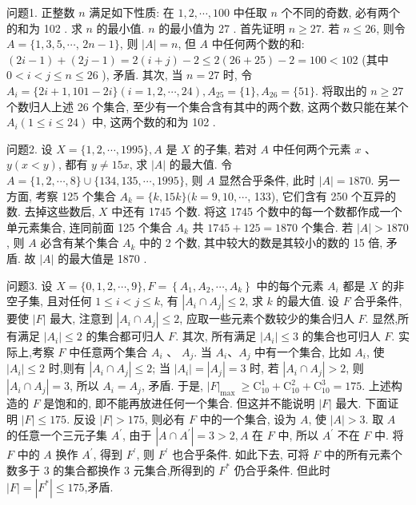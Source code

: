 
问题1. 正整数 $n$ 满足如下性质: 在 $1,2, \cdots, 100$ 中任取 $n$ 个不同的奇数, 必有两个的和为 102 . 求 $n$ 的最小值.
$n$ 的最小值为 27 . 首先证明 $n \geqslant 27$. 若 $n \leqslant 26$, 则令 $A=\{1,3,5, \cdots$, $2 n-1\}$, 则 $|A|=n$, 但 $A$ 中任何两个数的和: $(2 i-1)+(2 j-1)=2(i+j)- 2 \leqslant 2(26+25)-2=100<102$ (其中 $0<i<j \leqslant n \leqslant 26$ ), 矛盾.
其次, 当 $n=27$ 时, 令 $A_i=\{2 i+1,101-2 i\}(i=1,2, \cdots, 24), A_{25}=\{1\}, A_{26}= \{51\}$. 将取出的 $n \geqslant 27$ 个数归人上述 26 个集合, 至少有一个集合含有其中的两个数, 这两个数只能在某个 $A_i(1 \leqslant i \leqslant 24)$ 中, 这两个数的和为 102 .



问题2. 设 $X=\{1,2, \cdots, 1995\}, A$ 是 $X$ 的子集, 若对 $A$ 中任何两个元素 $x$ 、 $y(x<y)$, 都有 $y \neq 15 x$, 求 $|A|$ 的最大值.
令 $A=\{1,2, \cdots, 8\} \cup\{134,135, \cdots, 1995\}$, 则 $A$ 显然合乎条件, 此时 $|A|=1870$. 另一方面, 考察 125 个集合 $A_k=\{k, 15 k\}(k=9,10, \cdots$, 133), 它们含有 250 个互异的数.
去掉这些数后, $X$ 中还有 1745 个数.
将这 1745 个数中的每一个数都作成一个单元素集合, 连同前面 125 个集合 $A_k$ 共 $1745+125=1870$ 个集合.
若 $|A|>1870$, 则 $A$ 必含有某个集合 $A_k$ 中的 2 个数, 其中较大的数是其较小的数的 15 倍, 矛盾.
故 $|A|$ 的最大值是 1870 .



问题3. 设 $X=\{0,1,2, \cdots, 9\}, F=\left\{A_1, A_2, \cdots, A_k\right\}$ 中的每个元素 $A_i$ 都是 $X$ 的非空子集, 且对任何 $1 \leqslant i<j \leqslant k$, 有 $\left|A_i \cap A_j\right| \leqslant 2$, 求 $k$ 的最大值.
设 $F$ 合乎条件, 要使 $|F|$ 最大, 注意到 $\left|A_i \cap A_j\right| \leqslant 2$, 应取一些元素个数较少的集合归人 $F$. 显然,所有满足 $\left|A_i\right| \leqslant 2$ 的集合都可归人 $F$. 其次, 所有满足 $\left|A_i\right| \leqslant 3$ 的集合也可归人 $F$. 实际上,考察 $F$ 中任意两个集合 $A_i$ 、 $A_j$. 当 $A_i 、 A_j$ 中有一个集合, 比如 $A_i$, 使 $\left|A_i\right| \leqslant 2$ 时,则有 $\left|A_i \cap A_j\right| \leqslant 2$; 当 $\left|A_i\right|=\left|A_j\right|=3$ 时, 若 $\left|A_i \cap A_j\right|>2$, 则 $\left|A_i \cap A_j\right|=3$, 所以 $A_i=A_j$, 矛盾.
于是, $|F|_{\text {max }} \geqslant \mathrm{C}_{10}^1+\mathrm{C}_{10}^2+\mathrm{C}_{10}^3=175$. 上述构造的 $F$ 是饱和的, 即不能再放进任何一个集合.
但这并不能说明 $|F|$ 最大.
下面证明 $|F| \leqslant 175$. 反设 $|F|>175$, 则必有 $F$ 中的一个集合, 设为 $A$, 使 $|A|>3$. 取 $A$ 的任意一个三元子集 $A^{\prime}$, 由于 $\left|A \cap A^{\prime}\right|=3>2, A$ 在 $F$ 中, 所以 $A^{\prime}$ 不在 $F$ 中.
将 $F$ 中的 $A$ 换作 $A^{\prime}$, 得到 $F^{\prime}$, 则 $F^{\prime}$ 也合乎条件.
如此下去, 可将 $F$ 中的所有元素个数多于 3 的集合都换作 3 元集合,所得到的 $F^*$ 仍合乎条件.
但此时 $|F|= \left|F^*\right| \leqslant 175$,矛盾.



